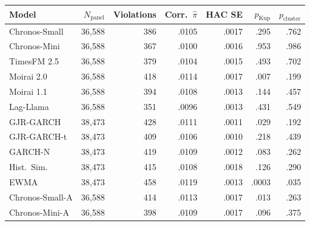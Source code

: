 \begin{tabular}{@{}lrrrrrr@{}}
\toprule
Model & $N_{\text{panel}}$ & Violations
& Corr.\ $\hat\pi$ & HAC SE
& $p_{\text{Kup}}$
& $p_{\text{cluster}}$ \\
\midrule
Chronos-Small & 36{,}588 & 386 & .0105
& .0017 & .295 & .762 \\
Chronos-Mini & 36{,}588 & 367 & .0100
& .0016 & .953 & .986 \\
TimesFM 2.5 & 36{,}588 & 379 & .0104
& .0015 & .493 & .702 \\
Moirai 2.0 & 36{,}588 & 418 & .0114
& .0017 & .007 & .199 \\
Moirai 1.1 & 36{,}588 & 394 & .0108
& .0013 & .144 & .457 \\
Lag-Llama & 36{,}588 & 351 & .0096
& .0013 & .431 & .549 \\
\midrule
GJR-GARCH & 38{,}473 & 428 & .0111
& .0011 & .029 & .192 \\
GJR-GARCH-t & 38{,}473 & 409 & .0106
& .0010 & .218 & .439 \\
GARCH-N & 38{,}473 & 419 & .0109
& .0012 & .083 & .262 \\
Hist.\ Sim. & 38{,}473 & 415 & .0108
& .0018 & .126 & .290 \\
EWMA & 38{,}473 & 458 & .0119
& .0013 & .0003 & .035 \\
Chronos-Small-A & 36{,}588 & 414 & .0113
& .0017 & .013 & .263 \\
Chronos-Mini-A & 36{,}588 & 398 & .0109
& .0017 & .096 & .375 \\
\bottomrule
\end{tabular}
